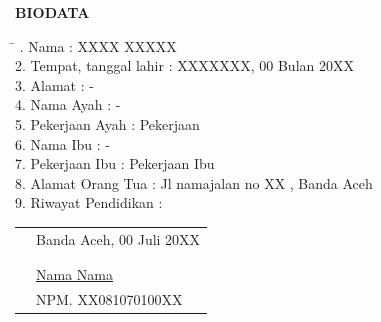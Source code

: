 

  \bigskip
  \vspace{1sp}
  \begin{center}
      \fontsize{14}{16}\selectfont
      \textup{\textbf{BIODATA}}
  \end{center}
  \vspace{2sp}

  \begin{tabbing}
    \hspace{2in} \= \hspace{2in} . Nama \> : XXXX XXXXX \\
    2. Tempat, tanggal lahir \> :  XXXXXXX, 00 Bulan 20XX \\
    3. Alamat \> : - \\
    4. Nama Ayah \> :  - \\
    5. Pekerjaan Ayah \> : Pekerjaan \\
    6. Nama Ibu \> : - \\
    7. Pekerjaan Ibu \> : Pekerjaan Ibu \\
    8. Alamat Orang Tua \> : Jl namajalan no XX , Banda Aceh \\
    9. Riwayat Pendidikan \> : 
  \end{tabbing}

  \begin{table}[H]
  \centering
  \end{table}


  \begin{tabular}{p{7.5cm}l}
    &Banda Aceh, 00 Juli 20XX\\
    &\\
    &\\
    &\multirow{1.5}{7.5cm}{\underline{Nama Nama}} \\ 
    &NPM. XX081070100XX \\
  \end{tabular}

      